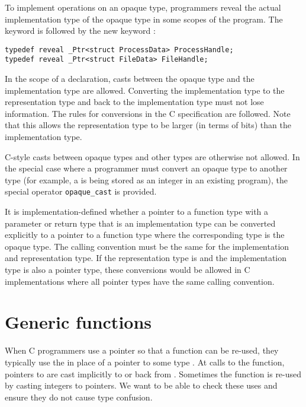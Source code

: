 To implement operations on an opaque type,
programmers reveal the actual implementation type of the opaque type
in some scopes of the program.  The
keyword  is followed by the new keyword :
\begin{lstlisting}
typedef reveal _Ptr<struct ProcessData> ProcessHandle;
typedef reveal _Ptr<struct FileData> FileHandle;
\end{lstlisting}
In the scope of a  declaration, casts between the
opaque type and the implementation type are allowed.  
Converting the implementation type to the representation
type and back to the implementation type must not lose information.  
The rules for conversions in the C specification are followed.   Note that 
this allows the representation type to be larger (in terms of bits) than the implementation type.

C-style casts between opaque types and other types are otherwise not allowed.
In the special case where a programmer must convert an opaque type to another
type (for example, a \uncheckedptrvoid{} is being stored as an integer in an existing
program), the special operator \lstinline|opaque_cast| is provided.

It is implementation-defined whether a pointer to a function type with a
parameter or return type that is an implementation type can be converted
explicitly to a pointer to a function type where the corresponding type
is the opaque type.   The calling convention must be the same for
the implementation and representation type.  If the representation type is \uncheckedptrvoid{}
and the implementation type is also a pointer type,  these conversions would be
allowed in C implementations where all pointer types have the same calling convention.

\section{Generic functions}
\label{sec:generic-functions}

When C programmers use a \uncheckedptrvoid{} pointer so that a function
can be re-used, they typically use the \uncheckedptrvoid{} in place of a pointer 
to some type .  At calls to the function, pointers to  are cast
implicitly to \uncheckedptrvoid{} or back from \uncheckedptrvoid{}.  
Sometimes the function is re-used by casting integers to \uncheckedptrvoid{} pointers.
We want to be able to check these uses and ensure they do not cause type confusion.


